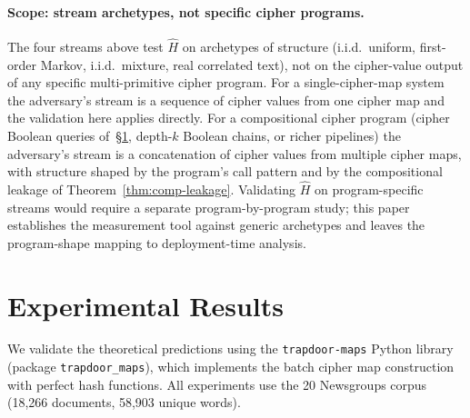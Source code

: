 \documentclass[11pt]{article}
\theoremstyle{definition}
\theoremstyle{plain}
\theoremstyle{remark}
\begin{document}
\paragraph{Scope: stream archetypes, not specific cipher programs.}
The four streams above test $\hat H$ on archetypes of structure
(i.i.d.\ uniform, first-order Markov, i.i.d.\ mixture, real
correlated text), not on the cipher-value output of any specific
multi-primitive cipher program.  For a single-cipher-map system
the adversary's stream is a sequence of cipher values from one
cipher map and the validation here applies directly.  For a
compositional cipher program (cipher Boolean queries
of~\S\ref{sec:experiments}, depth-$k$ Boolean chains, or richer
pipelines) the adversary's stream is a concatenation of cipher
values from multiple cipher maps, with structure shaped by the
program's call pattern and by the compositional leakage of
Theorem~\ref{thm:comp-leakage}.  Validating $\hat H$ on
program-specific streams would require a separate
program-by-program study; this paper establishes the measurement
tool against generic archetypes and leaves the program-shape
mapping to deployment-time analysis.



\section{Experimental Results}
\label{sec:experiments}

We validate the theoretical predictions using the \texttt{trapdoor-maps}
Python library (package \texttt{trapdoor\_maps}), which implements the
batch cipher map construction
with perfect hash functions.  All experiments use the 20 Newsgroups
corpus (18,266 documents, 58,903 unique words).
\end{document}
